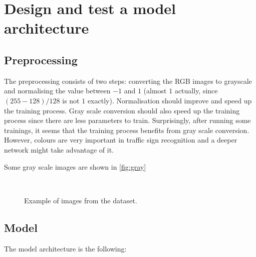 \documentclass{article}
\begin{document}
\section{Design and test a model architecture}
\subsection{Preprocessing}
The preprocessing consists of two steps: converting the RGB images to grayscale and normalising the value between $-1$ and $1$ (almost $1$ actually, since $(255-128)/128$ is not $1$ exactly). Normalisation should improve and speed up the training process. Gray scale conversion should also speed up the training process since there are less parameters to train. Surprisingly, after running some trainings, it seems that the training process benefits from gray scale conversion. However, colours are very important in traffic sign recognition and a deeper network might take advantage of it.

Some gray scale images are shown in \autoref{fig:gray}

\begin{figure}
\centering
{}\\
\caption{Example of images from the dataset.}
\label{fig:gray}
\end{figure}

\subsection{Model}
The model architecture is the following:
\end{document}
